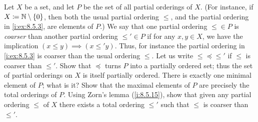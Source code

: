 \begin{ex}\label{i:ex:8.5.16}
  Let \(X\) be a set, and let \(P\) be the set of all partial orderings of \(X\).
  (For instance, if \(X \coloneqq \mathbb{N} \setminus \left\lbrace0\right\rbrace\), then both the usual partial ordering \(\leq\), and the partial ordering in \cref{i:ex:8.5.3}, are elements of \(P\).)
  We say that one partial ordering \(\leq \in P\) is \emph{coarser} than another partial ordering \(\leq' \in P\) if for any \(x, y \in X\), we have the implication \((x \leq y) \implies (x \leq' y)\).
  Thus, for instance the partial ordering in \cref{i:ex:8.5.3} is coarser than the usual ordering \(\leq\).
  Let us write \(\leq \preceq \leq'\) if \(\leq\) is coarser than \(\leq'\).
  Show that \(\preceq\) turns \(P\) into a partially ordered set;
  thus the set of partial orderings on \(X\) is itself partially ordered.
  There is exactly one minimal element of \(P\);
  what is it?
  Show that the maximal elements of \(P\) are precisely the total orderings of \(P\).
  Using Zorn's lemma (\cref{i:8.5.15}), show that given any partial ordering \(\leq\) of \(X\) there exists a total ordering \(\leq'\) such that \(\leq\) is coarser than \(\leq'\).
\end{ex}

